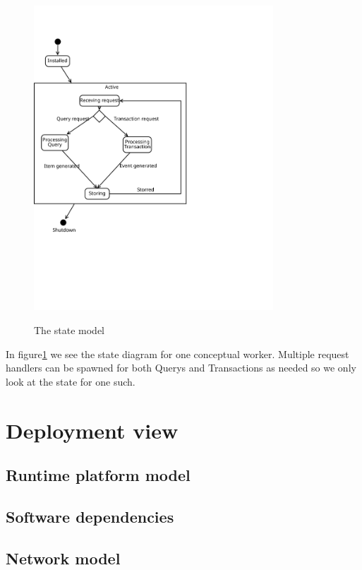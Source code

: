 \begin{figure}[h!]
  \centering
  \caption{The state model}
  \includegraphics[width=0.8\textwidth]{figures/state-model}
  \label{fig:state-model}
\end{figure}

In figure\ref{fig:state-model} we see the state diagram for one conceptual
worker. Multiple request handlers can be spawned for both Querys and
Transactions as needed so we only look at the state for one such.
\section{Deployment view}
\label{sec:deployment-view}


\subsection{Runtime platform model}
\label{sec:runt-platf-model}



\subsection{Software dependencies}
\label{sec:softw-depend}


\subsection{Network model}
\label{sec:network-model}


